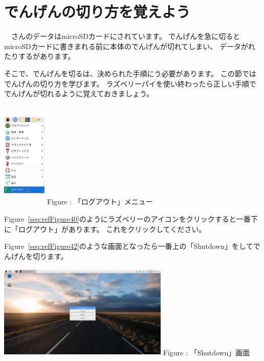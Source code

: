 \documentclass[a4paper,12pt]{jarticle}
\begin{document}
\section{でんげんの切り方を覚えよう}
\ \ さんのデータはmicroSDカードにされています。
でんげんを急に切るとmicroSDカードに書きまれる前に本体のでんげんが切れてしまい、
データがれたりするがあります。

そこで、でんげんを切るは、決められた手順にう必要があります。
この節ではでんげんの切り方を学びます。
ラズベリーパイを使い終わったら正しい手順ででんげんが切れるように覚えておきましょう。



\centering
\begin{minipage}{8.115cm}
  {\upshape
    \centering
    \includegraphics[width=2.1cm,height=5.1cm]{textbook-img206.png}
    \newline
    Figure {\theFigure\label{seq:refFigure40}}: 「ログアウト」メニュー}
\end{minipage}
\begin{minipage}{7.115cm}
  Figure~\ref{seq:refFigure40}のようにラズベリーのアイコンをクリックすると一番下に「ログアウト」があります。
  これをクリックしてください。
\end{minipage}
\bigskip


\flushleft
\textcolor[rgb]{0.13333334,0.13333334,0.13333334}{Figure~\ref{seq:refFigure42}のような画面となったら一番上の「Shutdown」をしてでんげんを切ります。}
\bigskip
\centering
\begin{minipage}{8.225cm}
  {\upshape
    \includegraphics[width=8.1cm,height=4.5cm]{textbook-img208.jpg}
    Figure {\theFigure\label{seq:refFigure42}}: 「Shutdown」画面}
\end{minipage}
\end{document}
